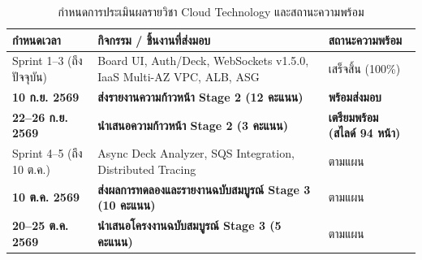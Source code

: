 \documentclass[12pt,a4paper]{report}
\begin{document}
\begin{table}[H]
\centering
\caption{กำหนดการประเมินผลรายวิชา Cloud Technology และสถานะความพร้อม}
\label{tab:milestones}
\begin{tabularx}{\textwidth}{l>{\raggedright\arraybackslash}X>{\centering\arraybackslash}p{3.8cm}}
\toprule
\textbf{กำหนดเวลา} & \textbf{กิจกรรม / ชิ้นงานที่ส่งมอบ} & \textbf{สถานะความพร้อม} \\
\midrule
Sprint 1--3 (ถึงปัจจุบัน) & Board UI, Auth/Deck, WebSockets v1.5.0, IaaS Multi-AZ VPC, ALB, ASG & เสร็จสิ้น (100\%) \\
\textbf{10 ก.ย. 2569} & \textbf{ส่งรายงานความก้าวหน้า Stage 2 (12 คะแนน)} & \textbf{พร้อมส่งมอบ} \\
\textbf{22--26 ก.ย. 2569} & \textbf{นำเสนอความก้าวหน้า Stage 2 (3 คะแนน)} & \textbf{เตรียมพร้อม (สไลด์ 94 หน้า)} \\
Sprint 4--5 (ถึง 10 ต.ค.) & Async Deck Analyzer, SQS Integration, Distributed Tracing & ตามแผน \\
\textbf{10 ต.ค. 2569} & \textbf{ส่งผลการทดลองและรายงานฉบับสมบูรณ์ Stage 3 (10 คะแนน)} & ตามแผน \\
\textbf{20--25 ต.ค. 2569} & \textbf{นำเสนอโครงงานฉบับสมบูรณ์ Stage 3 (5 คะแนน)} & ตามแผน \\
\bottomrule
\end{tabularx}
\end{table}
\end{document}
